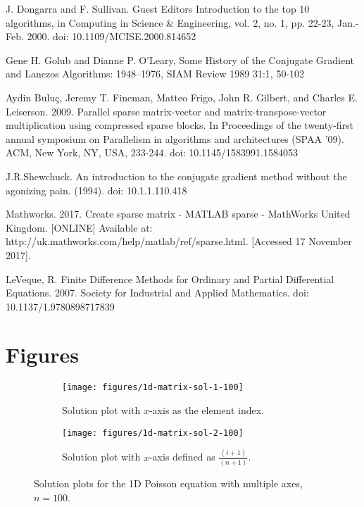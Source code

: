 \begin{thebibliography}{9}
    
        J. Dongarra and F. Sullivan.
        Guest Editors Introduction to the top 10 algorithms,
        in Computing in Science \& Engineering, vol. 2, no. 1, pp. 22-23, Jan.-Feb. 2000.
        doi: 10.1109/MCISE.2000.814652
    
        Gene H. Golub and Dianne P. O’Leary,
        Some History of the Conjugate Gradient and Lanczos Algorithms: 1948–1976,
        SIAM Review 1989 31:1, 50-102 
        
    	Aydin Buluç, Jeremy T. Fineman, Matteo Frigo, John R. Gilbert, and Charles E. Leiserson. 2009. 
        Parallel sparse matrix-vector and matrix-transpose-vector multiplication using compressed sparse blocks. 
        In Proceedings of the twenty-first annual symposium on Parallelism in algorithms and architectures (SPAA '09). ACM, New York, NY, USA, 233-244. 
        doi: 10.1145/1583991.1584053
        
    	J.R.Shewchuck.
        An introduction to the conjugate gradient method without the agonizing pain. (1994).
        doi: 10.1.1.110.418

    	Mathworks. 2017. 
        Create sparse matrix - MATLAB sparse - MathWorks United Kingdom. [ONLINE] 
        Available at: http://uk.mathworks.com/help/matlab/ref/sparse.html. [Accessed 17 November 2017].

    	LeVeque, R.
        Finite Difference Methods for Ordinary and Partial Differential Equations. 2007.
        Society for Industrial and Applied Mathematics.
        doi: 10.1137/1.9780898717839

\end{thebibliography}

\clearpage
\appendix

\section{Figures}

\begin{figure}[ht!]
\begin{subfigure}{\textwidth}
	\centering
    \texttt{[image: figures/1d-matrix-sol-1-100]}
    \caption{Solution plot with $x$-axis as the element index.}
\end{subfigure}
\par\bigskip
\begin{subfigure}{\textwidth}
	\centering
    \texttt{[image: figures/1d-matrix-sol-2-100]}
    \caption{Solution plot with $x$-axis defined as $\frac{(i+1)}{(n+1)}$.}
\end{subfigure}
\caption{Solution plots for the 1D Poisson equation with multiple axes, $n=100$.}
\label{fig:1d-matrix-solution}
\end{figure}

